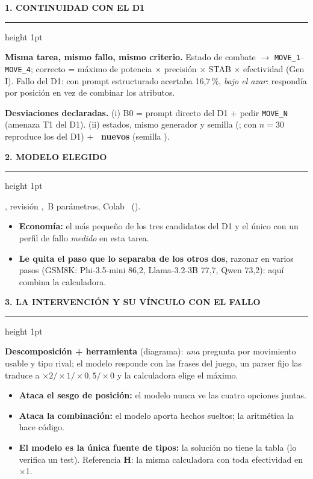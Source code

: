 \documentclass[10pt,a4paper]{extarticle}
\newcommand{\heading}[1]{%
  \par\vspace{1.2mm}\noindent
  {\color{navy}\bfseries\small\MakeUppercase{#1}}\par\vspace{0.5mm}
  {\color{amber}\hrule height 1pt}\vspace{0.9mm}\noindent\ignorespaces}
\begin{document}
\noindent
\begin{minipage}[t]{0.488\linewidth}
\setlength{\parskip}{0.55mm}
\heading{1. Continuidad con el D1}
\textbf{Misma tarea, mismo fallo, mismo criterio.} Estado de combate $\to$ \texttt{MOVE\_1}--\texttt{MOVE\_4}; correcto = m\'aximo de potencia $\times$ precisi\'on $\times$ STAB $\times$ efectividad (Gen I). Fallo del D1: con prompt estructurado acertaba 16{,}7\,\%, \emph{bajo el azar}: respond\'ia por posici\'on en vez de combinar los atributos.

\textbf{Desviaciones declaradas.} (i) B0 = prompt directo del D1 + pedir \texttt{MOVE\_N} (amenaza T1 del D1). (ii) \textbf{\nStates} estados, mismo generador y semilla (\seed; con $n{=}30$ reproduce los del D1) + \textbf{\holdN\ nuevos} (semilla \holdSeed).

\heading{2. Modelo elegido}
\textbf{\texttt{\modelId}}, revisi\'on \texttt{\modelRev}, \nParams\,B par\'ametros, Colab \hw\ (\libs). {\scriptsize \hwNote}
\begin{itemize}
\item \textbf{Econom\'ia:} el m\'as peque\~no de los tres candidatos del D1 y el \'unico con un perfil de fallo \emph{medido} en esta tarea.
\item \textbf{Le quita el paso que lo separaba de los otros dos}, razonar en varios pasos (GSM8K: Phi-3.5-mini 86{,}2, Llama-3.2-3B 77{,}7, Qwen 73{,}2): aqu\'i combina la calculadora.
\end{itemize}

\heading{3. La intervenci\'on y su v\'inculo con el fallo}
\textbf{Descomposici\'on + herramienta} (diagrama): \emph{una} pregunta por movimiento usable y tipo rival; el modelo responde con las frases del juego, un parser fijo las traduce a $\times2/\times1/\times0{,}5/\times0$ y la calculadora elige el m\'aximo.
\begin{itemize}
\item \textbf{Ataca el sesgo de posici\'on:} el modelo nunca ve las cuatro opciones juntas.
\item \textbf{Ataca la combinaci\'on:} el modelo aporta hechos sueltos; la aritm\'etica la hace c\'odigo.
\item \textbf{El modelo es la \'unica fuente de tipos:} la soluci\'on no tiene la tabla (lo verifica un test). Referencia \textbf{H}: la misma calculadora con toda efectividad en $\times$1.
\end{itemize}


\end{minipage}
\end{document}

